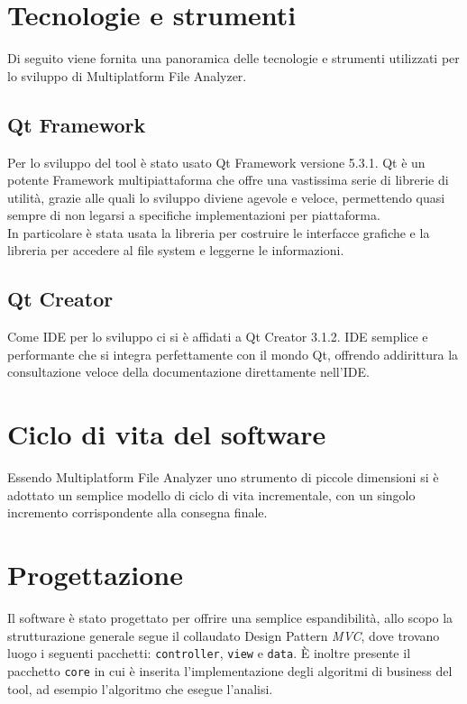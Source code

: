 \section{Tecnologie e strumenti}
	Di seguito viene fornita una panoramica delle tecnologie e strumenti utilizzati per lo sviluppo di Multiplatform File Analyzer.
	
	\subsection{Qt\textsuperscript{\textregistered} Framework}
		Per lo sviluppo del tool è stato usato Qt\textsuperscript{\textregistered} Framework versione 5.3.1. Qt\textsuperscript{\textregistered} è un potente Framework multipiattaforma che offre una vastissima serie di librerie di utilità, grazie alle quali lo sviluppo diviene agevole e veloce, permettendo quasi  sempre di non legarsi a specifiche implementazioni per piattaforma.\\
		In particolare è stata usata la libreria per costruire le interfacce grafiche e la libreria per accedere al file system e leggerne le informazioni.
		
	\subsection{Qt\textsuperscript{\textregistered} Creator}
		Come IDE per lo sviluppo ci si è affidati a Qt\textsuperscript{\textregistered} Creator 3.1.2. IDE semplice e performante che si integra perfettamente con il mondo Qt\textsuperscript{\textregistered}, offrendo addirittura la consultazione veloce della documentazione direttamente nell'IDE.
		
\section{Ciclo di vita del software}
	Essendo Multiplatform File Analyzer uno strumento di piccole dimensioni si è adottato un semplice modello di ciclo di vita incrementale, con un singolo incremento corrispondente alla consegna finale.
	
\section{Progettazione}
	Il software è stato progettato per offrire una semplice espandibilità, allo scopo la strutturazione generale segue il collaudato Design Pattern \textit{MVC}, dove trovano luogo i seguenti pacchetti: \texttt{controller}, \texttt{view} e \texttt{data}. È inoltre presente il pacchetto \texttt{core} in cui è inserita l'implementazione degli algoritmi di business del tool, ad esempio l'algoritmo che esegue l'analisi.\\
	
